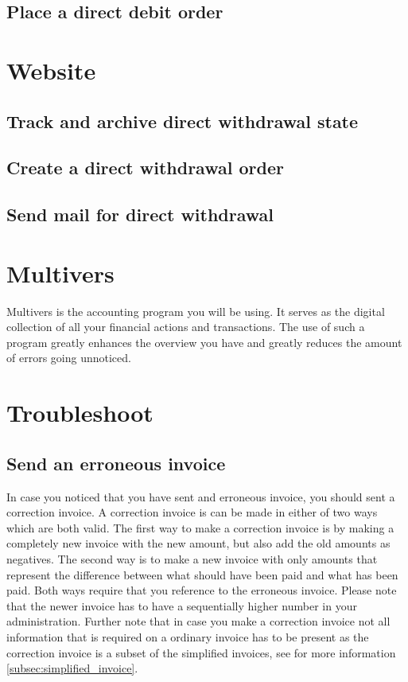 \documentclass{report}
\begin{document}
\subsection{Place a direct debit order}
\section{Website}
\subsection{Track and archive direct withdrawal state}
\subsection{Create a direct withdrawal order}
\subsection{Send mail for direct withdrawal}
\section{Multivers}
Multivers is the accounting program you will be using. It serves as the digital collection of all your financial actions and transactions. The use of such a program greatly enhances the overview you have and greatly reduces the amount of errors going unnoticed.
\section{Troubleshoot}
\subsection{Send an erroneous invoice}
In case you noticed that you have sent and erroneous invoice, you should sent a correction invoice. A correction invoice is can be made in either of two ways which are both valid. 
The first way to make a correction invoice is by making a completely new invoice with the new amount, but also add the old amounts as negatives.
The second way is to make a new invoice with only amounts that represent the difference between what should have been paid and what has been paid. 
Both ways require that you reference to the erroneous invoice. Please note that the newer invoice has to have a sequentially higher number in your administration. Further note that in case you make a correction invoice not all information that is required on a ordinary invoice has to be present as the correction invoice is a subset of the simplified invoices, see for more information \ref{subsec:simplified_invoice}.
\end{document}
